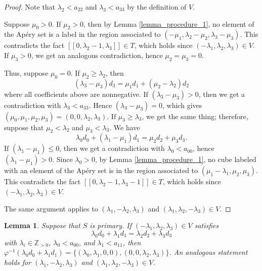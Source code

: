 \documentclass[12pt]{article}
\newtheorem{lemma}[thm]{Lemma}
\theoremstyle{remark}
\begin{document}
\begin{proof}
Note that $\lambda_2< a_{22}$ and $\lambda_3 < a_{33}$ by the definition of $V$. 

Suppose $\mu_0>0$. If $\mu_2 > 0$, then by Lemma \ref{lemma_procedure_1}, no element of the Ap{\'e}ry set is a label in the region associated to $(-\mu_1,\lambda_2-\mu_2,\lambda_3-\mu_3)$. This contradicts the fact $[[0,\lambda_2-1, \lambda_3]] \in T$, which holds since $(-\lambda_1,\lambda_2,\lambda_3) \in V$. If $\mu_3 > 0$, we get an analogous contradiction, hence $\mu_2=\mu_3 = 0$.

Thus, suppose $\mu_0 = 0$. If $\mu_2 \geq \lambda_2$, then
\begin{equation}
     (\lambda_3-\mu_3)d_3=\mu_1d_1 + (\mu_2 - \lambda_2)d_2
\end{equation}
where all coefficients above are nonnegative. If $(\lambda_3-\mu_3) > 0$, then we get a contradiction with $\lambda_3 < a_{33}$. Hence $(\lambda_3-\mu_3) = 0$, which gives $(\mu_0,\mu_1,\mu_2,\mu_3) = (0,0,\lambda_2,\lambda_3)$. If $\mu_3 \geq \lambda_3$, we get the same thing; therefore, suppose that $\mu_2 < \lambda_2$ and $\mu_3 < \lambda_3$. We have
\begin{equation}
   \lambda_0d_0 + (\lambda_1-\mu_1)d_1 = \mu_2d_2 + \mu_3d_3.
\end{equation}
If $(\lambda_1-\mu_1) \leq 0$, then we get a contradiction with $\lambda_0 < a_{00}$, hence $(\lambda_1-\mu_1) > 0$. Since $\lambda_0>0$, by Lemma \ref{lemma_procedure_1}, no cube labeled with an element of the Ap{\'e}ry set is in the region associated to $(\mu_1 - \lambda_1,\mu_2,\mu_3)$. This contradicts the fact $[[0,\lambda_2-1,\lambda_3-1]] \in T$, which holds since $(-\lambda_1,\lambda_2,\lambda_3) \in V$.

The same argument applies to $(\lambda_1,-\lambda_2,\lambda_3)$ and $(\lambda_1,\lambda_2,-\lambda_3) \in V$.
\end{proof}




\begin{lemma}\label{lemma_catenary_primary}
    Suppose that $S$ is primary. If $(-\lambda_1,\lambda_2,\lambda_3) \in V$ satisfies
    $$ \lambda_0d_0 + \lambda_1d_1 = \lambda_2d_2 + \lambda_3d_3$$
    with $\lambda_i \in \mathbb{Z}_{>0}$, $\lambda_0 < a_{00}$, and $ \lambda_1 < a_{11}$, then $\varphi^{-1}(\lambda_0d_0 + \lambda_1d_1) = \{(\lambda_0,\lambda_1,0,0), (0,0,\lambda_2,\lambda_3) \} $. An analogous statement holds for $(\lambda_1,-\lambda_2,\lambda_3)$ and $(\lambda_1,\lambda_2,-\lambda_3) \in V$. 
\end{lemma}
\end{document}

